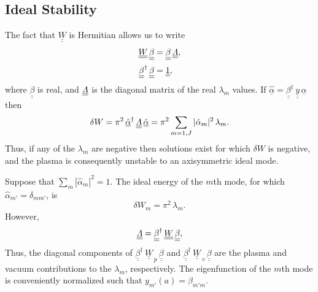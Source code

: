 \documentclass[12pt,prb,aps]{revtex4-1}
\begin{document}
\subsection{Ideal Stability}
The fact that $\underline{\underline{W}}$ is Hermitian allows us to write
\begin{align}
\underline{\underline{W}}\,\underline{\underline{\beta}} &= \underline{\underline{\beta}}\,\underline{\underline{\mit\Lambda}},\\[0.5ex]
\underline{\underline{\beta}}^\dag\,\underline{\underline{\beta}} &= \underline{\underline{1}},
\end{align}
where $\underline{\underline{\beta}}$ is real, and $\underline{\underline{\mit\Lambda}}$ is the diagonal matrix of the real $\lambda_m$ values. 
If $\underline{\hat{\alpha}}= \underline{\underline{\beta}}^\dag\,\underline{\underline{y}}\,\underline{\alpha}$ then
\begin{equation}
\delta W =\pi^2\,\underline{\hat{\alpha}}^\dag\,\underline{\underline{\mit\Lambda}}\,\underline{\hat{\alpha}}=\pi^2\sum_{m=1,J}|\hat{\alpha}_m|^2\,\lambda_m.
\end{equation}
Thus, if any of the $\lambda_m$ are negative then solutions exist for which $\delta W$ is negative, and the plasma is consequently unstable to
an axisymmetric ideal mode.\cite{gs1}

Suppose that $\sum_{m}|\hat{\alpha}_m|^2=1$. The ideal energy of the $m$th mode,
for which $\hat{\alpha}_{m'} = \delta_{mm'}$,  is
\begin{equation}
\delta W_m = \pi^2\,\lambda_m.
\end{equation}
However,
\begin{equation}
\underline{\underline{\mit\Lambda}} = \underline{\underline{\beta}}^\dag\,\underline{\underline{W}}\,\underline{\underline{\beta}},
\end{equation}
Thus, the diagonal components of $\underline{\underline{\beta}}^\dag\,\underline{\underline{W}}_{\,p}\,\underline{\underline{\beta}}$ 
and $\underline{\underline{\beta}}^\dag\,\underline{\underline{W}}_{\,v}\,\underline{\underline{\beta}}$  are the plasma and vacuum
contributions to the $\lambda_m$, respectively. 
 The eigenfunction of the $m$th mode is conveniently normalized such that $y_{m'}(a)= \beta_{m'm}$. 
 
\end{document}
